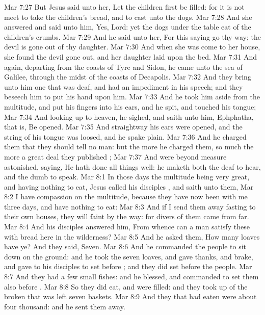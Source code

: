 \vs Mar 7:27 But Jesus said unto her, Let the children first be filled: for it is not meet to take the children's bread, and to cast  unto the dogs.
\vs Mar 7:28 And she answered and said unto him, Yes, Lord: yet the dogs under the table eat of the children's crumbs.
\vs Mar 7:29 And he said unto her, For this saying go thy way; the devil is gone out of thy daughter.
\vs Mar 7:30 And when she was come to her house, she found the devil gone out, and her daughter laid upon the bed.
\vs Mar 7:31 And again, departing from the coasts of Tyre and Sidon, he came unto the sea of Galilee, through the midst of the coasts of Decapolis.
\vs Mar 7:32 And they bring unto him one that was deaf, and had an impediment in his speech; and they beseech him to put his hand upon him.
\vs Mar 7:33 And he took him aside from the multitude, and put his fingers into his ears, and he spit, and touched his tongue;
\vs Mar 7:34 And looking up to heaven, he sighed, and saith unto him, Ephphatha, that is, Be opened.
\vs Mar 7:35 And straightway his ears were opened, and the string of his tongue was loosed, and he spake plain.
\vs Mar 7:36 And he charged them that they should tell no man: but the more he charged them, so much the more a great deal they published ;
\vs Mar 7:37 And were beyond measure astonished, saying, He hath done all things well: he maketh both the deaf to hear, and the dumb to speak.
\vs Mar 8:1 In those days the multitude being very great, and having nothing to eat, Jesus called his disciples , and saith unto them,
\vs Mar 8:2 I have compassion on the multitude, because they have now been with me three days, and have nothing to eat:
\vs Mar 8:3 And if I send them away fasting to their own houses, they will faint by the way: for divers of them came from far.
\vs Mar 8:4 And his disciples answered him, From whence can a man satisfy these  with bread here in the wilderness?
\vs Mar 8:5 And he asked them, How many loaves have ye? And they said, Seven.
\vs Mar 8:6 And he commanded the people to sit down on the ground: and he took the seven loaves, and gave thanks, and brake, and gave to his disciples to set before ; and they did set  before the people.
\vs Mar 8:7 And they had a few small fishes: and he blessed, and commanded to set them also before .
\vs Mar 8:8 So they did eat, and were filled: and they took up of the broken  that was left seven baskets.
\vs Mar 8:9 And they that had eaten were about four thousand: and he sent them away.
